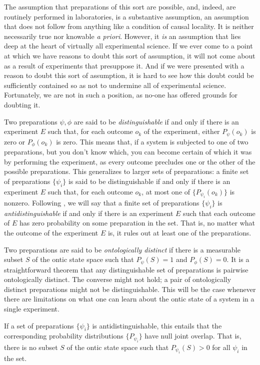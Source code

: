 \documentclass[12pt]{article}
\begin{document}
The assumption that preparations of this sort are possible, and, indeed, are routinely performed in laboratories, is a substantive assumption, an assumption that does not follow from anything like a condition of causal locality. It is neither necessarily true nor knowable \emph{a priori}.  However, it \emph{is} an assumption that lies deep at the heart of virtually all experimental science.  If we ever come to a point at which we have reasons to doubt this sort of assumption, it will not come about as a result of experiments that presuppose it.  And if we were presented with a reason to doubt this sort of assumption, it is hard to see how this doubt could be sufficiently contained so as not to undermine all of experimental science.  Fortunately, we are not in such a position, as no-one has offered grounds for doubting it.

Two preparations $\psi, \phi$ are said to be \emph{distinguishable} if and only if there is an experiment $E$ such that, for each  outcome $o_k$ of the experiment, either $P_\psi(o_k)$ is zero or  $P_\phi(o_k)$ is zero.  This means that, if a system is subjected to one of two preparations, but you don't know which, you can become certain of which it was by performing the experiment, as every outcome precludes one or the other of the possible preparations. This generalizes to larger sets of preparations: a finite  set of preparations $\{\psi_i \}$ is said to be {distinguishable} if and only if there is an experiment $E$ such that, for each outcome $o_k$, at most one of $\{P_{\psi_i}(o_k)\}$ is nonzero. Following \citet{LeiferPsiOnt}, we will say that a finite set of preparations  $\{\psi_i \}$ is \emph{antidistinguishable} if and only if there is an experiment $E$ such that each outcome of $E$ has zero probability on some preparation in the set.  That is, no matter what the outcome of the experiment $E$ is, it rules out at least one of the preparations.

Two preparations are said to be \emph{ontologically distinct} if there is a measurable subset $S$ of the ontic state space such that $P_\psi(S) = 1$ and $P_\phi(S) = 0$.  It is a straightforward theorem that any distinguishable set of preparations is pairwise ontologically distinct. The converse might not hold; a pair of ontologically distinct preparations might not be distinguishable. This will be the case whenever there are limitations on what one can learn about the ontic state of a system in a single experiment.

If a set of preparations $\{\psi_i \}$ is antidistinguishable, this entails that the corresponding probability distributions $\{P_{\psi_i}\}$ have null joint overlap.  That is, there is no subset $S$ of the ontic state space such that $P_{\psi_i}(S) > 0$ for all $\psi_i$ in the set.
\end{document}
